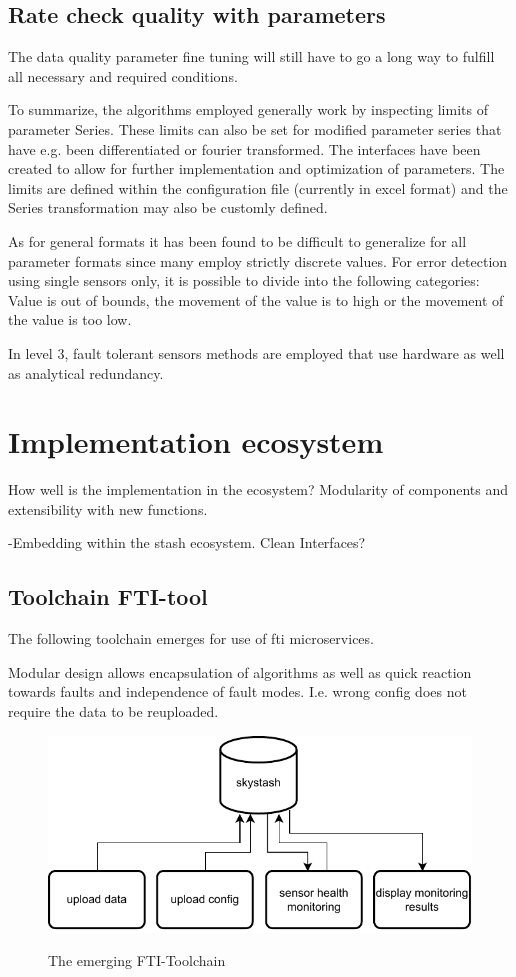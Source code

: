 \subsection{Rate check quality with parameters}
The data quality parameter fine tuning will still have to go a long way to fulfill all necessary and required conditions.

To summarize, the algorithms employed generally work by inspecting limits of parameter Series. These limits can also be set for modified parameter series that have e.g. been differentiated or fourier transformed. The interfaces have been created to allow for further implementation and optimization of parameters. The limits are defined within the configuration file (currently in excel format) and the Series transformation may also be customly defined.

As for general formats it has been found to be difficult to generalize for all parameter formats since many employ strictly discrete values. For error detection using single sensors only, it is possible to divide into the following categories: Value is out of bounds, the movement of the value is to high or the movement of the value is too low.

In level 3, fault tolerant sensors methods are employed that use hardware as well as analytical redundancy. \cite[p.355-365]{isermann_fault-diagnosis_2006}





\section{Implementation ecosystem}

How well is the implementation in the ecosystem? Modularity of components and extensibility with new functions.


-Embedding within the stash ecosystem. Clean Interfaces?



\subsection{Toolchain FTI-tool}
The following toolchain emerges for use of fti microservices.

Modular design allows encapsulation of algorithms as well as quick reaction towards faults and independence of fault modes.
I.e. wrong config does not require the data to be reuploaded.


\begin{figure}
    \centering
    \includegraphics[width=.7\textwidth]{03_figures/FTI_microservices}
    \label{fig:fti-micro}
    \caption{The emerging FTI-Toolchain}
\end{figure}


